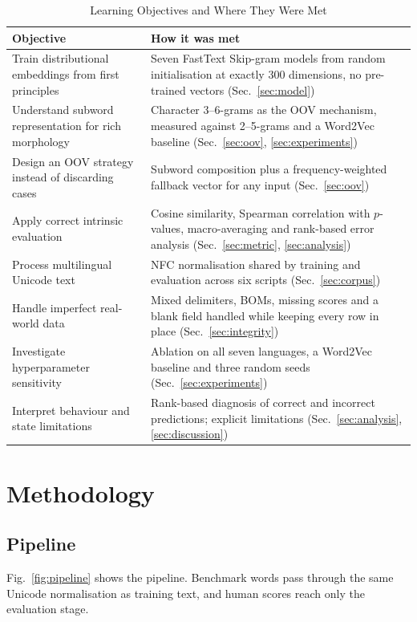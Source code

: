 \documentclass[conference,10pt]{IEEEtran}
\begin{document}
\begin{table}[!t]
\caption{Learning Objectives and Where They Were Met}
\label{tab:objectives}
\centering
\renewcommand{\arraystretch}{1.2}
\scriptsize
\setlength{\tabcolsep}{3pt}
\begin{tabular}{|p{3.1cm}|p{4.55cm}|}
\hline
\rowcolor{srcblue!15}
\textbf{Objective} & \textbf{How it was met} \\
\hline
Train distributional embeddings from first principles & Seven FastText Skip-gram models from random initialisation at exactly 300 dimensions, no pre-trained vectors (Sec.~\ref{sec:model}) \\
\hline
Understand subword representation for rich morphology & Character 3--6-grams as the OOV mechanism, measured against 2--5-grams and a Word2Vec baseline (Sec.~\ref{sec:oov}, \ref{sec:experiments}) \\
\hline
Design an OOV strategy instead of discarding cases & Subword composition plus a frequency-weighted fallback vector for any input (Sec.~\ref{sec:oov}) \\
\hline
Apply correct intrinsic evaluation & Cosine similarity, Spearman correlation with $p$-values, macro-averaging and rank-based error analysis (Sec.~\ref{sec:metric}, \ref{sec:analysis}) \\
\hline
Process multilingual Unicode text & NFC normalisation shared by training and evaluation across six scripts (Sec.~\ref{sec:corpus}) \\
\hline
Handle imperfect real-world data & Mixed delimiters, BOMs, missing scores and a blank field handled while keeping every row in place (Sec.~\ref{sec:integrity}) \\
\hline
Investigate hyperparameter sensitivity & Ablation on all seven languages, a Word2Vec baseline and three random seeds (Sec.~\ref{sec:experiments}) \\
\hline
Interpret behaviour and state limitations & Rank-based diagnosis of correct and incorrect predictions; explicit limitations (Sec.~\ref{sec:analysis}, \ref{sec:discussion}) \\
\hline
\end{tabular}
\end{table}

\section{Methodology}

\subsection{Pipeline}
Fig.~\ref{fig:pipeline} shows the pipeline. Benchmark words pass through the same Unicode normalisation as training text, and human scores reach only the evaluation stage.
\end{document}
